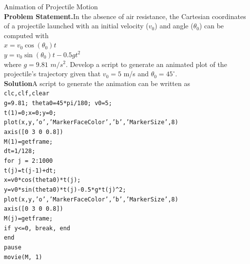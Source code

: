 \documentclass[../main.tex]{subfiles}
\begin{document}
\begin{example} Animation of Projectile Motion
    \bigskip\\
    \textbf{Problem Statement.}\quad In the absence of air resistance, the Cartesian coordinates of a projectile
    launched with an initial velocity ($v_0$) and angle ($\theta_0$) can be computed with\\
    
    $x = v_0 \cos(\theta_0)t$\\
    \indent
    $y = v_0 \sin(\theta_0)t - 0.5gt^2$\\

    \noindent where $g = 9.81$ $m/s^2$. Develop a script to generate an animated plot of the projectile's
    trajectory given that $v_0 = 5$ m/s and $\theta_0 = 45^{\circ}$.\\

    \noindent\textbf{Solution}\quad A script to generate the animation can be written as\\

    \texttt{clc,clf,clear\\
    \indent g=9.81; theta0=45*pi/180; v0=5;\\
    \indent t(1)=0;x=0;y=0;\\
    \indent plot(x,y,'o','MarkerFaceColor','b','MarkerSize',8)\\
    \indent axis([0 3 0 0.8])\\
    \indent M(1)=getframe;\\
    \indent dt=1/128;\\
    \indent for j = 2:1000\\
    \indent\hspace{2mm} t(j)=t(j-1)+dt;\\
    \indent\hspace{2mm} x=v0*cos(theta0)*t(j);\\
    \indent\hspace{2mm} y=v0*sin(theta0)*t(j)-0.5*g*t(j)\textasciicircum2;\\
    \indent\hspace{2mm} plot(x,y,'o','MarkerFaceColor','b','MarkerSize',8)\\
    \indent\hspace{2mm} axis([0 3 0 0.8])\\
    \indent\hspace{2mm} M(j)=getframe;\\
    \indent\hspace{2mm} if y<=0, break, end\\
    \indent end\\
    \indent pause\\
    \indent movie(M, 1)}\\


\end{example}
\end{document}
